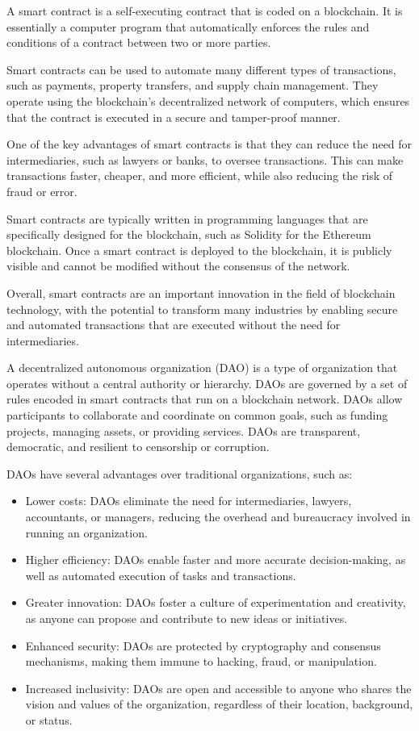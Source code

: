 \documentclass[lettersize,journal]{IEEEtran}
\begin{document}
A smart contract is a self-executing contract that is coded on a blockchain. It is essentially a computer program that automatically enforces the rules and conditions of a contract between two or more parties.

Smart contracts can be used to automate many different types of transactions, such as payments, property transfers, and supply chain management. They operate using the blockchain's decentralized network of computers, which ensures that the contract is executed in a secure and tamper-proof manner.

One of the key advantages of smart contracts is that they can reduce the need for intermediaries, such as lawyers or banks, to oversee transactions. This can make transactions faster, cheaper, and more efficient, while also reducing the risk of fraud or error.

Smart contracts are typically written in programming languages that are specifically designed for the blockchain, such as Solidity for the Ethereum blockchain. Once a smart contract is deployed to the blockchain, it is publicly visible and cannot be modified without the consensus of the network.

Overall, smart contracts are an important innovation in the field of blockchain technology, with the potential to transform many industries by enabling secure and automated transactions that are executed without the need for intermediaries.

A decentralized autonomous organization (DAO) is a type of organization that operates without a central authority or hierarchy. DAOs are governed by a set of rules encoded in smart contracts that run on a blockchain network. DAOs allow participants to collaborate and coordinate on common goals, such as funding projects, managing assets, or providing services. DAOs are transparent, democratic, and resilient to censorship or corruption.

DAOs have several advantages over traditional organizations, such as:

\begin{itemize}
\item{Lower costs: DAOs eliminate the need for intermediaries, lawyers, accountants, or managers, reducing the overhead and bureaucracy involved in running an organization.}
\item{Higher efficiency: DAOs enable faster and more accurate decision-making, as well as automated execution of tasks and transactions.}
\item{Greater innovation: DAOs foster a culture of experimentation and creativity, as anyone can propose and contribute to new ideas or initiatives.}
\item{Enhanced security: DAOs are protected by cryptography and consensus mechanisms, making them immune to hacking, fraud, or manipulation.}
\item{Increased inclusivity: DAOs are open and accessible to anyone who shares the vision and values of the organization, regardless of their location, background, or status.}
\end{itemize}
\end{document}
